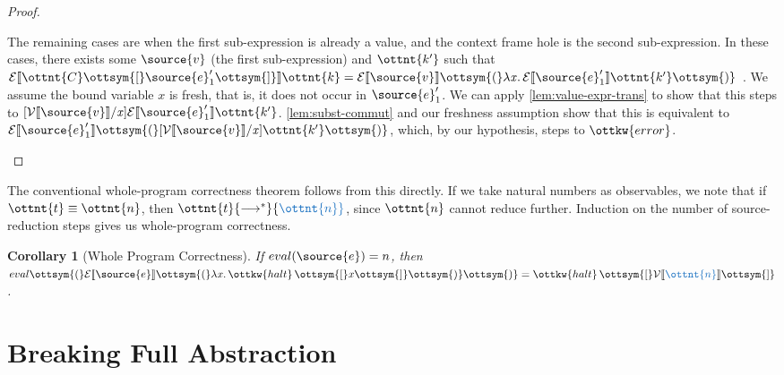 \documentclass[11pt]{article}
\newcommand{\blue}[1]{ {\color{RoyalBlue}{{#1}}} }
\newtheorem{corollary}{Corollary}[section]
\begin{document}
\begin{proof}
\begin{itemize}
		
		The remaining cases are when the first sub-expression is already a value, and the context frame hole is the second sub-expression.
		In these cases, there exists some $\source{v}$ (the first sub-expression) and $\ottnt{k'}$
		such that $ \mathcal{E}\llbracket  \ottnt{C}  \ottsym{[}  \source{e}'_{{\mathrm{1}}}  \ottsym{]}  \rrbracket  \ottnt{k}  =   \mathcal{E}\llbracket  \source{v}  \rrbracket  \ottsym{(}  \lambda  \mathit{x}  \ldotp   \mathcal{E}\llbracket  \source{e}'_{{\mathrm{1}}}  \rrbracket  \ottnt{k'}   \ottsym{)}  $ .
		We assume the bound variable $\mathit{x}$ is fresh, that is, it does not occur in $\source{e}'_{{\mathrm{1}}}$.
		We can apply \autoref{lem:value-expr-trans} to show that this steps to $ [   \mathcal{V}\llbracket  \source{v}  \rrbracket   /  \mathit{x}  ]   \mathcal{E}\llbracket  \source{e}'_{{\mathrm{1}}}  \rrbracket  \ottnt{k'}  $.
		 \autoref{lem:subst-commut} and our freshness assumption 
		show that this is equivalent to
		$ \mathcal{E}\llbracket  \source{e}'_{{\mathrm{1}}}  \rrbracket  \ottsym{(}   [   \mathcal{V}\llbracket  \source{v}  \rrbracket   /  \mathit{x}  ]  \ottnt{k'}   \ottsym{)} $, which, by our hypothesis,
		steps to $\ottkw{error}$.
		

		  
	\end{itemize}
\end{proof}

The conventional whole-program correctness theorem follows from this directly.
If we take natural numbers as observables, we note that if $\ottnt{t}\equiv\ottnt{n}$, then $\ottnt{t}  {\longrightarrow^{*} }   \blue{ \ottnt{n} } $,
since $\ottnt{n}$ cannot reduce further. Induction on the number of source-reduction steps gives us whole-program correctness.

\begin{corollary}[Whole Program Correctness] 
	If ${eval(\source{e})=n}$, then ${eval\ottsym{(}   \mathcal{E}\llbracket  \source{e}  \rrbracket  \ottsym{(}  \lambda  \mathit{x}  \ldotp  \ottkw{halt} \, \ottsym{[}  \mathit{x}  \ottsym{]}  \ottsym{)}   \ottsym{)}=\ottkw{halt} \, \ottsym{[}   \mathcal{V}\llbracket   \blue{ \ottnt{n} }   \rrbracket   \ottsym{]}}$.
\end{corollary}
 
\section{Breaking Full Abstraction}
\end{document}
